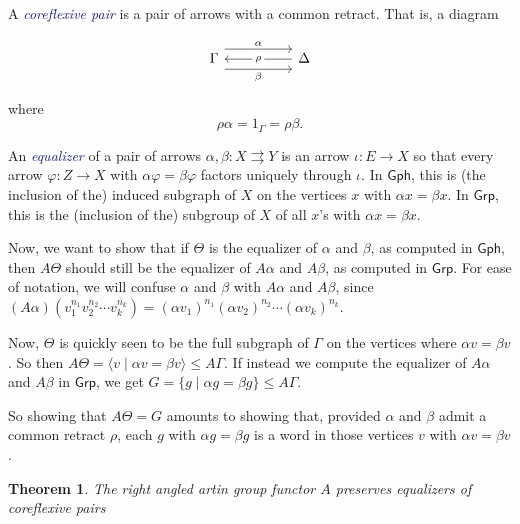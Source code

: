 \documentclass[microtype]{gtpart}
\newtheorem{thm}{Theorem}
\theoremstyle{definition}
\theoremstyle{theorem}
\newcommand*{\catFont}[1]{\mathsf{#1}}
\newcommand{\Grp}{\catFont{Grp}}
\newcommand*{\important}[1]{\textcolor{MidnightBlue}{\emph{#1}}}
\begin{document}
A \important{coreflexive pair} is a pair of arrows with a common retract. 
That is, a diagram

\setlength\mathsurround{0pt}
\[\begin{tikzcd}
	\Gamma && \Delta
	\arrow["\alpha", shift left=3, from=1-1, to=1-3]
	\arrow["\beta"', shift right=3, from=1-1, to=1-3]
	\arrow["\rho"{description}, from=1-3, to=1-1]
\end{tikzcd}\]
\setlength\mathsurround{0.8pt}

where \[ \rho \alpha = 1_\Gamma = \rho \beta. \]

An \important{equalizer} of a pair of arrows 
$\alpha, \beta : X \rightrightarrows Y$ is an arrow $\iota : E \to X$
so that every arrow $\varphi : Z \to X$ with $\alpha \varphi = \beta \varphi$ 
factors uniquely through $\iota$. 
In $\mathsf{Gph}$, this is (the inclusion of the) induced subgraph of $X$ 
on the vertices $x$ with $\alpha x = \beta x$. In $\mathsf{Grp}$,
this is the (inclusion of the) subgroup of $X$ of all
$x$'s with $\alpha x = \beta x$.

Now, we want to show that if $\Theta$ is the equalizer of $\alpha$ and $\beta$,
as computed in $\mathsf{Gph}$, 
then $A\Theta$ should still be the equalizer of $A \alpha$ and $A \beta$, 
as computed in $\mathsf{Grp}$.
For ease of notation, we will confuse $\alpha$ and $\beta$ with $A \alpha$
and $A \beta$, since 
$(A\alpha)(v_1^{n_1} v_2^{n_2} \cdots v_k^{n_k}) = (\alpha v_1)^{n_1} (\alpha v_2)^{n_2} \cdots (\alpha v_k)^{n_k}$.

Now, $\Theta$ is quickly seen to be the full subgraph of $\Gamma$
on the vertices where $\alpha v = \beta v$. 
So then $A\Theta = \langle v \mid \alpha v = \beta v \rangle \leq A \Gamma$.
If instead we compute the equalizer of $A \alpha$ and $A \beta$ in $\Grp$,
we get $G = \{ g \mid \alpha g = \beta g \} \leq A\Gamma$.

So showing that $A \Theta = G$ amounts to showing that, provided $\alpha$ 
and $\beta$ admit a common retract $\rho$, each $g$ 
with $\alpha g = \beta g$ is a word in those vertices $v$ with $\alpha v = \beta v$.

\begin{thm}
    The right angled artin group functor $A$ preserves equalizers of coreflexive pairs
\end{thm}
\end{document}
